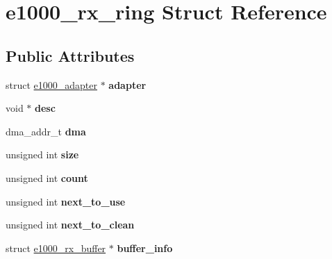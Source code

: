 \hypertarget{structe1000__rx__ring}{
\section{e1000\_\-rx\_\-ring Struct Reference}
\label{structe1000__rx__ring}
}
\subsection*{Public Attributes}
\begin{DoxyCompactItemize}
\item 
\hypertarget{structe1000__rx__ring_af9ecfc6c9d2d5a82bcb6abae373d5883}{
struct \hyperlink{structe1000__adapter}{e1000\_\-adapter} $\ast$ {\bfseries adapter}}
\label{structe1000__rx__ring_af9ecfc6c9d2d5a82bcb6abae373d5883}

\item 
\hypertarget{structe1000__rx__ring_a9ee5e4166a0de005f952cc7131a89c84}{
void $\ast$ {\bfseries desc}}
\label{structe1000__rx__ring_a9ee5e4166a0de005f952cc7131a89c84}

\item 
\hypertarget{structe1000__rx__ring_a21b3d80e9a85328ecee741f1a842f42f}{
dma\_\-addr\_\-t {\bfseries dma}}
\label{structe1000__rx__ring_a21b3d80e9a85328ecee741f1a842f42f}

\item 
\hypertarget{structe1000__rx__ring_a3ada80aa6bf5f5e2250ee87d951004e7}{
unsigned int {\bfseries size}}
\label{structe1000__rx__ring_a3ada80aa6bf5f5e2250ee87d951004e7}

\item 
\hypertarget{structe1000__rx__ring_ab621e53c5e38337824814ac53269d9da}{
unsigned int {\bfseries count}}
\label{structe1000__rx__ring_ab621e53c5e38337824814ac53269d9da}

\item 
\hypertarget{structe1000__rx__ring_a1838be378e40cb4f22ea49d314a3d926}{
unsigned int {\bfseries next\_\-to\_\-use}}
\label{structe1000__rx__ring_a1838be378e40cb4f22ea49d314a3d926}

\item 
\hypertarget{structe1000__rx__ring_aed81f035429fa11974ee84915c45cbfc}{
unsigned int {\bfseries next\_\-to\_\-clean}}
\label{structe1000__rx__ring_aed81f035429fa11974ee84915c45cbfc}

\item 
\hypertarget{structe1000__rx__ring_a53ead28ad8588042a5ae0300da7a048a}{
struct \hyperlink{structe1000__rx__buffer}{e1000\_\-rx\_\-buffer} $\ast$ {\bfseries buffer\_\-info}}
\label{structe1000__rx__ring_a53ead28ad8588042a5ae0300da7a048a}


\end{DoxyCompactItemize}
